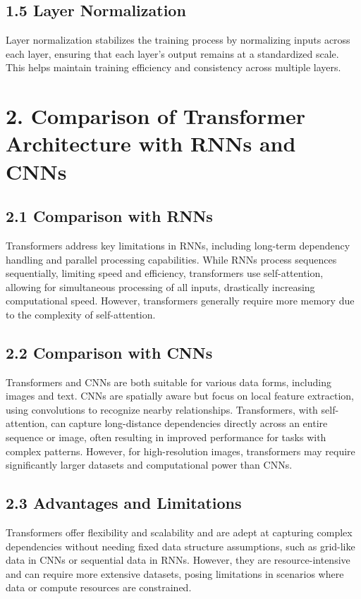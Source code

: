 \documentclass[12pt]{article}
\begin{document}
\subsection*{1.5 Layer Normalization}
Layer normalization stabilizes the training process by normalizing inputs across each layer, ensuring that each layer's output remains at a standardized scale. This helps maintain training efficiency and consistency across multiple layers.

\section*{2. Comparison of Transformer Architecture with RNNs and CNNs}

\subsection*{2.1 Comparison with RNNs}
Transformers address key limitations in RNNs, including long-term dependency handling and parallel processing capabilities. While RNNs process sequences sequentially, limiting speed and efficiency, transformers use self-attention, allowing for simultaneous processing of all inputs, drastically increasing computational speed. However, transformers generally require more memory due to the complexity of self-attention.

\subsection*{2.2 Comparison with CNNs}
Transformers and CNNs are both suitable for various data forms, including images and text. CNNs are spatially aware but focus on local feature extraction, using convolutions to recognize nearby relationships. Transformers, with self-attention, can capture long-distance dependencies directly across an entire sequence or image, often resulting in improved performance for tasks with complex patterns. However, for high-resolution images, transformers may require significantly larger datasets and computational power than CNNs.

\subsection*{2.3 Advantages and Limitations}
Transformers offer flexibility and scalability and are adept at capturing complex dependencies without needing fixed data structure assumptions, such as grid-like data in CNNs or sequential data in RNNs. However, they are resource-intensive and can require more extensive datasets, posing limitations in scenarios where data or compute resources are constrained.
\end{document}
